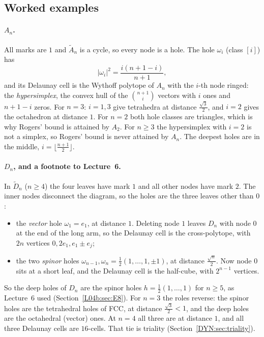 \documentclass[11pt,openany]{book}
\theoremstyle{plain}
\theoremstyle{definition}
\theoremstyle{remark}
\newcommand{\abs}[1]{\left\lvert #1 \right\rvert}
\begin{document}
\subsection*{Worked examples}

\paragraph{$A_n$.} All marks are $1$ and $\tilde A_n$ is a cycle, so every node is a hole. The hole
$\omega_i$ (class $[i]$) has
\[
  \abs{\omega_i}^2=\frac{i(n+1-i)}{n+1},
\]
and its Delaunay cell is the Wythoff polytope of $A_n$ with the $i$-th node ringed: the \emph{hypersimplex},
the convex hull of the $\binom{n+1}i$ vectors with $i$ ones and $n+1-i$ zeros. For $n=3$:
$i=1,3$ give tetrahedra at distance $\frac{\sqrt3}2$, and $i=2$ gives the octahedron at distance $1$. For
$n=2$ both hole classes are triangles, which is why Rogers' bound is attained by $A_2$. For $n\ge3$ the
hypersimplex with $i=2$ is not a simplex, so Rogers' bound is never attained by $A_n$. The deepest holes
are in the middle, $i=\lfloor\frac{n+1}2\rfloor$.

\paragraph{$D_n$, and a footnote to Lecture~6.} In $\tilde D_n$ ($n\ge4$) the four leaves have mark
$1$ and all other nodes have mark $2$. The inner nodes disconnect the diagram, so the holes are the three
leaves other than $0$:
\begin{itemize}
\item the \emph{vector} hole $\omega_1=e_1$, at distance $1$. Deleting node $1$ leaves $D_n$ with node $0$ at
  the end of the long arm, so the Delaunay cell is the cross-polytope, with $2n$ vertices $0,2e_1,e_1\pm e_j$;
\item the two \emph{spinor} holes $\omega_{n-1},\omega_n=\frac12(1,\dots,1,\pm1)$, at distance $\frac{\sqrt n}2$.
  Now node $0$ sits at a short leaf, and the Delaunay cell is the half-cube, with $2^{n-1}$ vertices.
\end{itemize}
So the deep holes of $D_n$ are the spinor holes $h=\frac12(1,\dots,1)$ for $n\ge5$, as Lecture~6 used
(Section~\ref{L04b:sec:E8}). For $n=3$ the roles reverse: the spinor holes are the tetrahedral holes
of FCC, at distance $\frac{\sqrt3}2<1$, and the deep holes are the octahedral (vector) ones. At $n=4$ all three are
at distance $1$, and all three Delaunay cells are $16$-cells. That tie is triality
(Section~\ref{DYN:sec:triality}).
\end{document}

